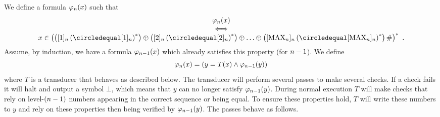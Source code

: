 We define a formula
${\varphi_{n}}\mathord{\left( x \right)}$
such that
\[
    \begin{array}{c}
        \goodnums{\expheight}{x} \\
        \iff \\
        x \in \brac{
            \brac{\tenc{\expheight}{1} \brac{\numeq \tenc{\expheight}{1}}^\ast}
            \numplus
            \brac{\tenc{\expheight}{2} \brac{\numeq \tenc{\expheight}{2}}^\ast}
            \numplus
            \ldots
            \numplus
            \brac{
                \tenc{\expheight}{\nmax{\expheight}}
                    \brac{\numeq \tenc{\expheight}{\nmax{\expheight}}}^\ast
            }
            \numsep
        }^\ast \ .
    \end{array}
\]
Assume, by induction, we have a formula
${\varphi_{n-1}}\mathord{\left( x \right)}$
which already satisfies this property (for $n-1$).
We define
\[
    {\varphi_{n}}\mathord{\left( x \right)} =
    \left( 
        y = {T}\mathord{\left( x \right)}
        \land
        {\varphi_{n-1}}\mathord{\left( y \right)}
     \right)
\]
where $T$ is a transducer that behaves as described below.
The transducer will perform several passes to make several checks.
If a check fails it will halt and output a symbol $\bot$, which means that $y$ can no longer satisfy
${\varphi_{n-1}}\mathord{\left( y \right)}$.
During normal execution $T$ will make checks that rely on level-$(n-1)$ numbers appearing in the correct sequence or being equal.
To ensure these properties hold, $T$ will write these numbers to $y$ and rely on these properties then being verified by
${\varphi_{n-1}}\mathord{\left( y \right)}$.
The passes behave as follows.
